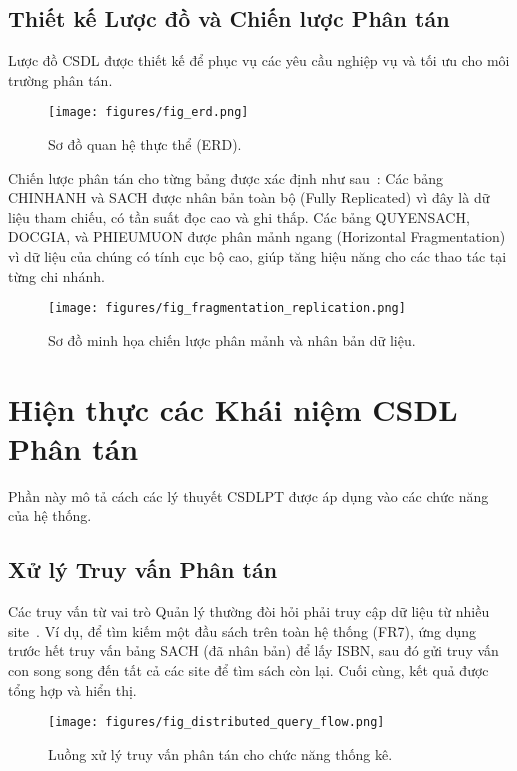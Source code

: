 \documentclass[conference]{IEEEtran}
\begin{document}
\subsection{Thiết kế Lược đồ và Chiến lược Phân tán}
Lược đồ CSDL được thiết kế để phục vụ các yêu cầu nghiệp vụ và tối ưu cho môi trường phân tán.

\begin{figure}[H]
\centering
\texttt{[image: figures/fig\_erd.png]} 
\caption{Sơ đồ quan hệ thực thể (ERD).}
\label{fig_erd}
\end{figure}

Chiến lược phân tán cho từng bảng được xác định như sau~\cite{ozsu_valduriez_2020}:
Các bảng CHINHANH và SACH được nhân bản toàn bộ (Fully Replicated) vì đây là dữ liệu tham chiếu, có tần suất đọc cao và ghi thấp. Các bảng QUYENSACH, DOCGIA, và PHIEUMUON được phân mảnh ngang (Horizontal Fragmentation) vì dữ liệu của chúng có tính cục bộ cao, giúp tăng hiệu năng cho các thao tác tại từng chi nhánh.

\begin{figure}[H]
\centering
\texttt{[image: figures/fig\_fragmentation\_replication.png]} 
\caption{Sơ đồ minh họa chiến lược phân mảnh và nhân bản dữ liệu.}
\label{fig_fragmentation_replication}
\end{figure}

\section{Hiện thực các Khái niệm CSDL Phân tán}
Phần này mô tả cách các lý thuyết CSDLPT được áp dụng vào các chức năng của hệ thống.

\subsection{Xử lý Truy vấn Phân tán}
Các truy vấn từ vai trò Quản lý thường đòi hỏi phải truy cập dữ liệu từ nhiều site~\cite{ozsu_valduriez_2020}. Ví dụ, để tìm kiếm một đầu sách trên toàn hệ thống (FR7), ứng dụng trước hết truy vấn bảng SACH (đã nhân bản) để lấy ISBN, sau đó gửi truy vấn con song song đến tất cả các site để tìm sách còn lại. Cuối cùng, kết quả được tổng hợp và hiển thị.

\begin{figure}[H]
\centering
\texttt{[image: figures/fig\_distributed\_query\_flow.png]} 
\caption{Luồng xử lý truy vấn phân tán cho chức năng thống kê.}
\label{fig_distributed_query_flow}
\end{figure}
\end{document}
